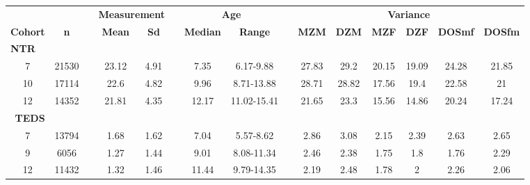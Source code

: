 \begin{tabular}{ccrccrccrcccccc}
  \toprule
  \multicolumn{2}{c}{} &       & \multicolumn{2}{c}{\textbf{Measurement}} &       & \multicolumn{2}{c}{\textbf{Age}} &       & \multicolumn{6}{c}{\textbf{Variance}} \\
  \cmidrule{4-5}\cmidrule{7-8}\cmidrule{10-15}    \textbf{Cohort} & \textbf{n} &       & \textbf{Mean} & \textbf{Sd} &       & \textbf{Median} & \textbf{Range} &       & \textbf{MZM} & \textbf{DZM} & \textbf{MZF} & \textbf{DZF} & \textbf{DOSmf} & \textbf{DOSfm} \\
  \midrule
  \multicolumn{15}{l}{\textbf{NTR}} \\
  7     & 21530 &       & 23.12 & 4.91  &       & 7.35  & 6.17-9.88 &       & 27.83 & 29.2  & 20.15 & 19.09 & 24.28 & 21.85 \\
  10    & 17114 &       & 22.6  & 4.82  &       & 9.96  & 8.71-13.88 &       & 28.71 & 28.82 & 17.56 & 19.4  & 22.58 & 21 \\
  12    & 14352 &       & 21.81 & 4.35  &       & 12.17 & 11.02-15.41 &       & 21.65 & 23.3  & 15.56 & 14.86 & 20.24 & 17.24 \\
  \multicolumn{1}{r}{\textbf{TEDS}} &       &       &       &       &       &       &       &       &       &       &       &       &       &  \\
  7     & 13794 &       & 1.68  & 1.62  &       & 7.04  & 5.57-8.62 &       & 2.86  & 3.08  & 2.15  & 2.39  & 2.63  & 2.65 \\
  9     & 6056  &       & 1.27  & 1.44  &       & 9.01  & 8.08-11.34 &       & 2.46  & 2.38  & 1.75  & 1.8   & 1.76  & 2.29 \\
  12    & 11432 &       & 1.32  & 1.46  &       & 11.44 & 9.79-14.35 &       & 2.19  & 2.48  & 1.78  & 2     & 2.26  & 2.06 \\
  \bottomrule
\end{tabular}%
